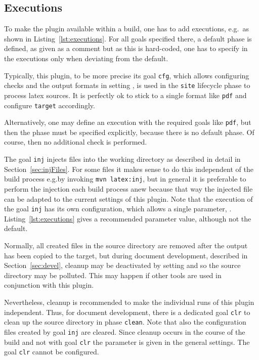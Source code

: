 \subsection{Executions}\label{subsec:xmlPomExecutions}

To make the plugin available within a build,
one has to add executions, e.g.~as shown in Listing~\ref{lst:executions}. 
For all goals specified there, a default phase is defined, 
as given as a comment but as this is hard-coded, 
one has to specify in the executions only 
when deviating from the default. 

Typically, this plugin, to be more precise its goal \texttt{cfg}, 
which allows configuring checks and the output formats in setting ,  
is used in the \texttt{site} lifecycle phase 
to process latex sources. 
It is perfectly ok to stick to a single format like \texttt{pdf} 
and configure \texttt{target} accordingly. 

Alternatively, one may define an execution with the required goals like \texttt{pdf}, 
but then the phase must be specified explicitly, because there is no default phase. 
Of course, then no additional check is performed. 

The goal \texttt{inj} injects files into the working directory  
as described in detail in Section~\ref{sec:injFiles}. 
For some files it makes sense to do this independent of the build process 
e.g.\@ by invoking \texttt{mvn latex:inj}, 
but in general it is preferable to perform the injection each build process anew 
because that way the injected file can be adapted 
to the current settings of this plugin. 
Note that the execution of the goal \texttt{inj} has its own configuration, 
which allows a single parameter, . 
Listing~\ref{lst:executions} gives a recommended parameter value, 
although not the default. 

Normally, all created files in the source directory are removed 
after the output has been copied to the target, 
but during document development, described in Section~\ref{sec:devel}, 
cleanup may be deactivated by setting  
and so the source directory may be polluted. 
This may happen if other tools are used in conjunction with this plugin. 

Nevertheless, cleanup is recommended to make the individual runs of this plugin independent.
Thus, for document development, there is a dedicated goal \texttt{clr} 
to clean up the source directory in phase \texttt{clean}. 
Note that also the configuration files created by goal \texttt{inj} are cleared. 
Since cleanup occurs in the course of the build and not with goal \texttt{clr} 
the parameter  is given in the general settings. 
The goal \texttt{clr} cannot be configured. 

